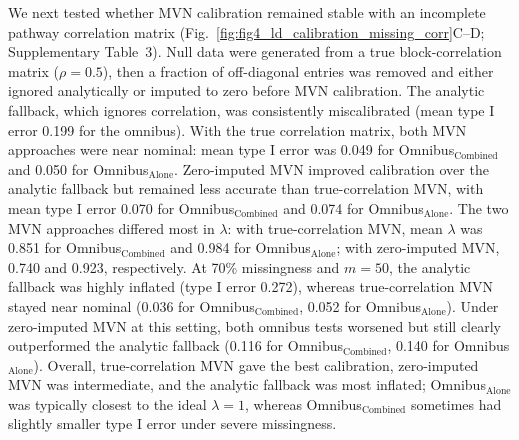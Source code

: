 \documentclass[unnumsec,webpdf,contemporary,large]{oup-authoring-template}%
\theoremstyle{thmstyleone}%
\theoremstyle{thmstyletwo}%
\theoremstyle{thmstylethree}%
\begin{document}
We next tested whether MVN calibration remained stable with an incomplete pathway correlation matrix (Fig.~\ref{fig:fig4_ld_calibration_missing_corr}C--D; Supplementary Table~3). Null data were generated from a true block-correlation matrix (\(\rho=0.5\)), then a fraction of off-diagonal entries was removed and either ignored analytically or imputed to zero before MVN calibration. The analytic fallback, which ignores correlation, was consistently miscalibrated (mean type I error 0.199 for the omnibus). With the true correlation matrix, both MVN approaches were near nominal: mean type I error was 0.049 for Omnibus\(_\text{Combined}\) and 0.050 for Omnibus\(_\text{Alone}\). Zero-imputed MVN improved calibration over the analytic fallback but remained less accurate than true-correlation MVN, with mean type I error 0.070 for Omnibus\(_\text{Combined}\) and 0.074 for Omnibus\(_\text{Alone}\). The two MVN approaches differed most in \(\lambda\): with true-correlation MVN, mean \(\lambda\) was 0.851 for Omnibus\(_\text{Combined}\) and 0.984 for Omnibus\(_\text{Alone}\); with zero-imputed MVN, 0.740 and 0.923, respectively. At 70\% missingness and \(m=50\), the analytic fallback was highly inflated (type I error 0.272), whereas true-correlation MVN stayed near nominal (0.036 for Omnibus\(_\text{Combined}\), 0.052 for Omnibus\(_\text{Alone}\)). Under zero-imputed MVN at this setting, both omnibus tests worsened but still clearly outperformed the analytic fallback (0.116 for Omnibus\(_\text{Combined}\), 0.140 for Omnibus\(_\text{Alone}\)). Overall, true-correlation MVN gave the best calibration, zero-imputed MVN was intermediate, and the analytic fallback was most inflated; Omnibus\(_\text{Alone}\) was typically closest to the ideal \(\lambda=1\), whereas Omnibus\(_\text{Combined}\) sometimes had slightly smaller type I error under severe missingness.
\end{document}
